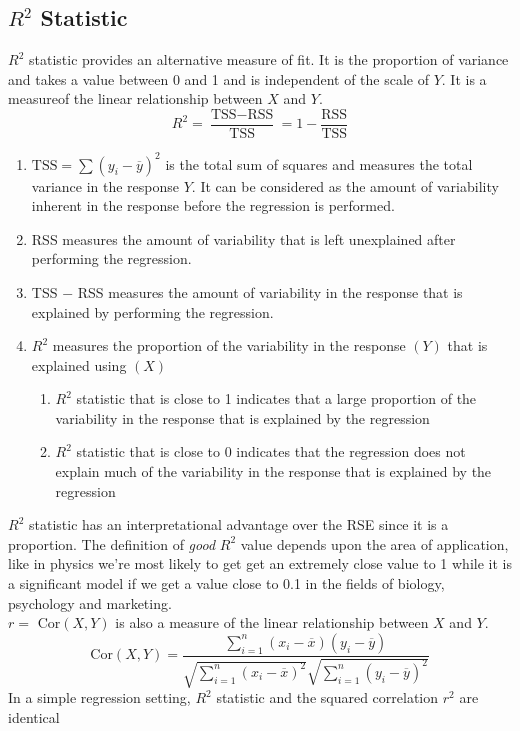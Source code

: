 \documentclass{article}
\begin{document}
\subsection*{$R^{2}$ Statistic}
$R^2$ statistic provides an alternative measure of fit. It is the proportion of variance and takes a value between 0 and 1 and is independent of the scale of $Y$. It is a measureof the linear relationship between $X$ and $Y$.
\begin{equation*} R^2 = \frac{\text{TSS}-\text{RSS}}{\text{TSS}} = 1 - \frac{\text{RSS}}{\text{TSS}} \end{equation*}
\begin{enumerate}
    \item $\text{TSS} = \sum {(y_i - \overline{y})}^2$ is the total sum of squares and measures the total variance in the response $Y$. It can be considered as the amount of variability inherent in the response before the regression is performed.
    \item RSS measures the amount of variability that is left unexplained after performing the regression. 
    \item TSS $-$ RSS measures the amount of variability in the response that is explained by performing the regression. 
    \item $R^2$ measures the proportion of the variability in the response $(Y)$ that is explained using $(X)$
    \begin{enumerate}
        \item $R^2$ statistic that is close to 1 indicates that a large proportion of the variability in the response that is explained by the regression
        \item $R^2$ statistic that is close to 0 indicates that the regression does not explain much of the variability in the response that is explained by the regression
    \end{enumerate}
\end{enumerate}
\vspace{2mm}
$R^2$ statistic has an interpretational advantage over the RSE since it is a proportion. The definition of \textit{good} $R^2$ value depends upon the area of application, like in physics we're most likely to get get an extremely close value to 1 while it is a significant model if we get a value close to 0.1 in the fields of biology, psychology and marketing. \\
$r =$ Cor$(X,Y)$ is also a measure of the linear relationship between $X$ and $Y$. 
\begin{equation*} \text{Cor}(X,Y) = \frac{\sum_{i=1}^{n} (x_i - \overline{x})(y_i - \overline{y})}{\sqrt{\sum_{i=1}^{n} {(x_i - \overline{x})}^2} \sqrt{\sum_{i=1}^{n} {(y_i - \overline{y})}^2}}  \end{equation*}
In a simple regression setting, $R^2$ statistic and the squared correlation $r^2$ are identical 
\end{document}
